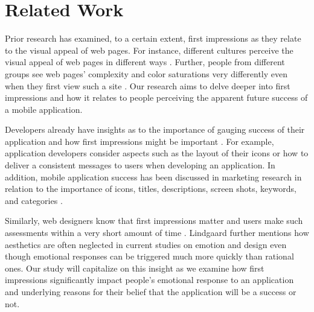 \section{Related Work}


Prior research has examined, to a certain extent, first impressions as they relate to the visual appeal of web pages. For instance, different cultures perceive the visual appeal of web pages in different ways \cite{Reinecke:2013:PUF:2470654.2481281}. Further, people from different groups see web pages' complexity and color saturations very differently even when they first view such a site \cite{Reinecke:2013:PUF:2470654.2481281}. Our research aims to delve deeper into first impressions and how it relates to people perceiving the apparent future success of a mobile application.

Developers already have insights as to the importance of gauging success of their application and how first impressions might be important \cite{wooldridge2010the}. For example, application developers consider aspects such as the layout of their icons or how to deliver a consistent messages to users when developing an application.  In addition, mobile application success has been discussed in marketing research in relation to the importance of icons, titles, descriptions, screen shots, keywords, and categories \cite{mureta12:app}.


Similarly, web designers know that first impressions matter and users make such assessments within a very short amount of time \cite{lindgaard}. Lindgaard further mentions how aesthetics are often neglected in current studies on emotion and design even though emotional responses can be triggered much more quickly than rational ones\cite{lindgaard}. Our study will capitalize on this insight as we examine how first impressions significantly impact people's emotional response to an application and underlying reasons for their belief that the application will be a success or not.
